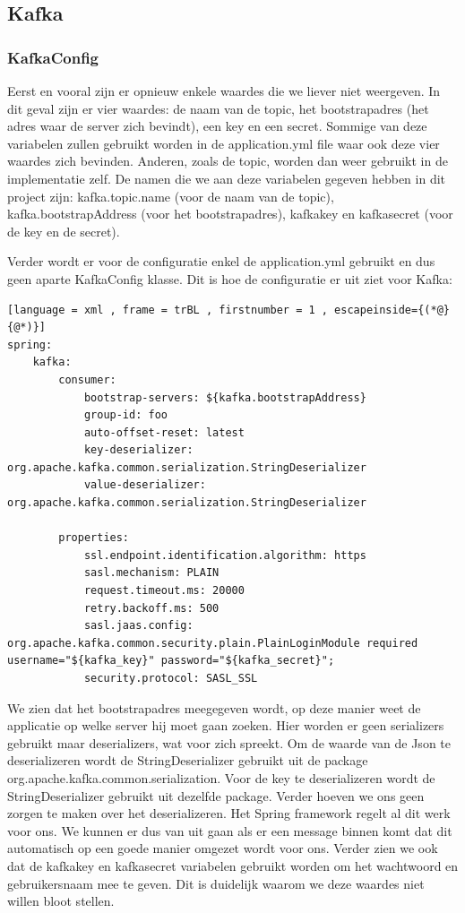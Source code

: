 \subsection{Kafka}
\subsubsection{KafkaConfig}
Eerst en vooral zijn er opnieuw enkele waardes die we liever niet weergeven. In dit geval zijn er vier waardes: de  naam van de topic, het bootstrapadres (het adres waar de server zich bevindt), een key en een secret. Sommige van deze variabelen zullen gebruikt worden in de application.yml file waar ook deze vier waardes zich bevinden. Anderen, zoals de topic, worden dan weer gebruikt in de implementatie zelf. De namen die we aan deze variabelen gegeven hebben in dit project zijn: kafka.topic.name (voor de naam van de topic), kafka.bootstrapAddress (voor het bootstrapadres), kafka\textunderscore key en kafka\textunderscore secret (voor de key en de secret).

Verder wordt er voor de configuratie enkel de application.yml gebruikt en dus geen aparte KafkaConfig klasse. Dit is hoe de configuratie er uit ziet voor Kafka:
\begin{lstlisting}[language = xml , frame = trBL , firstnumber = 1 , escapeinside={(*@}{@*)}]
spring:
    kafka:
        consumer:
            bootstrap-servers: ${kafka.bootstrapAddress}
            group-id: foo
            auto-offset-reset: latest
            key-deserializer: org.apache.kafka.common.serialization.StringDeserializer
            value-deserializer: org.apache.kafka.common.serialization.StringDeserializer

        properties:
            ssl.endpoint.identification.algorithm: https
            sasl.mechanism: PLAIN
            request.timeout.ms: 20000
            retry.backoff.ms: 500
            sasl.jaas.config: org.apache.kafka.common.security.plain.PlainLoginModule required username="${kafka_key}" password="${kafka_secret}";
            security.protocol: SASL_SSL
\end{lstlisting}

We zien dat het bootstrapadres meegegeven wordt, op deze manier weet de applicatie op welke server hij moet gaan zoeken. Hier worden er geen serializers gebruikt maar deserializers, wat voor zich spreekt. Om de waarde van de Json te deserializeren wordt de StringDeserializer gebruikt uit de package org.apache.kafka.common.serialization. Voor de key te deserializeren wordt de StringDeserializer gebruikt uit dezelfde package. Verder hoeven we ons geen zorgen te maken over het deserializeren. Het Spring framework regelt al dit werk voor ons. We kunnen er dus van uit gaan als er een message binnen komt dat dit automatisch op een goede manier omgezet wordt voor ons. Verder zien we ook dat de kafka\textunderscore key en kafka\textunderscore secret variabelen gebruikt worden om het wachtwoord en gebruikersnaam mee te geven. Dit is duidelijk waarom we deze waardes niet willen bloot stellen. 

